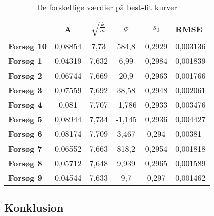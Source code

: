 \begin{table}
\centering
\begin{tabular}{|l|c|c|c|c|l|}
\hline
\textbf{}          & \textbf{A} & \textbf{$\sqrt{\frac{k}{m}}$} & \textbf{$\phi$} & \textbf{$s_0$} & \textbf{RMSE} \\ \hline
\textbf{Forsøg 10} & 0,08854    & 7,73                          & 584,8           & 0,2929         & 0,003136      \\ \hline
\textbf{Forsøg 1}  & 0,04319    & 7,632                         & 6,99            & 0,2984         & 0,001839      \\ \hline
\textbf{Forsøg 2}  & 0,06744    & 7,669                         & 20,9            & 0,2963         & 0,001766      \\ \hline
\textbf{Forsøg 3}  & 0,07559    & 7,692                         & 38,58           & 0,2948         & 0,002061      \\ \hline
\textbf{Forsøg 4}  & 0,081      & 7,707                         & -1,786          & 0,2933         & 0,003476      \\ \hline
\textbf{Forsøg 5}  & 0,08944    & 7,734                         & -1,145          & 0,2936         & 0,004427      \\ \hline
\textbf{Forsøg 6}  & 0,08174    & 7,709                         & 3,467           & 0,294          & 0,00381       \\ \hline
\textbf{Forsøg 7}  & 0,06552    & 7,663                         & 818,2           & 0,2954         & 0,001818      \\ \hline
\textbf{Forsøg 8}  & 0,05712    & 7,648                         & 9,939           & 0,2965         & 0,001589      \\ \hline
\textbf{Forsøg 9}  & 0,04544    & 7,633                         & 9,7             & 0,297          & 0,001462      \\ \hline
\end{tabular}

\caption{De forskellige værdier på best-fit kurver}
\end{table}

\subsection{Konklusion}



